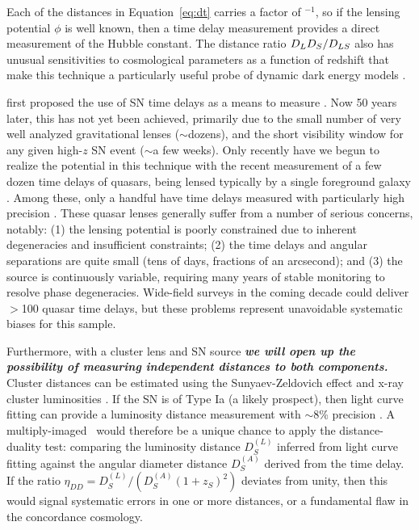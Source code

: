 Each of the distances in Equation~\ref{eq:dt} carries a factor
of \Ho$^{-1}$, so if the lensing potential $\phi$ is well known, then a
time delay measurement provides a direct measurement of the Hubble
constant.  The distance ratio $D_LD_S/D_{LS}$ also has
unusual sensitivities to cosmological parameters as a function of
redshift that make this technique a particularly useful probe of
dynamic dark energy models \citep{Linder:2011}.

\citet{Refsdal:1964} first proposed the use of SN time delays as 
a means to measure \Ho.  Now 50 years later, this has not yet been
achieved, primarily due to the small number of very well analyzed
gravitational lenses ($\sim$dozens), and the short visibility window
for any given high-$z$ SN event ($\sim$a few weeks).  Only recently
have we begun to realize the potential in this technique with the
recent measurement of a few dozen time delays of quasars, being lensed
typically by a single foreground galaxy \citep{Jackson:2007}. Among
these, only a handful have time delays measured with particularly high
precision \citep[e.g.]{Suyu:2010,Suyu:2013}.  These quasar lenses
generally suffer from a number of serious concerns, notably: (1) the
lensing potential is poorly constrained due to inherent degeneracies
and insufficient constraints; (2) the time delays and angular
separations are quite small (tens of days, fractions of an arcsecond);
and (3) the source is continuously variable, requiring many years of
stable monitoring to resolve phase degeneracies.  Wide-field surveys
in the coming decade could deliver $>$100 quasar time delays, but
these problems represent unavoidable systematic biases for this
sample.

Furthermore, with a cluster lens and SN source {\bf \em we will open up
the possibility of measuring independent distances to both
components.}  Cluster distances can be estimated using the
Sunyaev-Zeldovich effect and x-ray cluster
luminosities \citep{Silk:1978}.  If the SN is of Type Ia (a likely
prospect), then light curve fitting can provide a luminosity distance
measurement with $\sim$8\% precision \citep{Phillips:1993}.  A
multiply-imaged \SNIa\ would therefore be a unique chance to apply the
distance-duality test: comparing the luminosity distance $D_{S}^{(L)}$
inferred from light curve fitting against the angular diameter
distance $D_{S}^{(A)}$ derived from the time delay.  If the ratio
$\eta_{DD} = D_{S}^{(L)} / ( D_{S}^{(A)}(1+z_S)^2 )$ deviates from
unity, then this would signal systematic errors in one or more
distances, or a fundamental flaw in the concordance cosmology.


